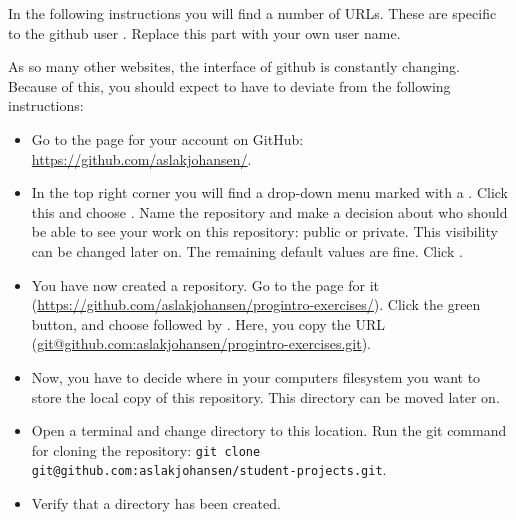 In the following instructions you will find a number of URLs. These are specific to the github user . Replace this part with your own user name.

As so many other websites, the interface of github is constantly changing. Because of this, you should expect to have to deviate from the following instructions:

\begin{itemize}
  \item Go to the page for your account on GitHub: \url{https://github.com/aslakjohansen/}.
  \item In the top right corner you will find a drop-down menu marked with a \say{+}. Click this and choose . Name the repository  and make a decision about who should be able to see your work on this repository: public or private. This visibility can be changed later on. The remaining default values are fine. Click .
  \item You have now created a repository. Go to the page for it (\url{https://github.com/aslakjohansen/progintro-exercises/}). Click the green  button, and choose  followed by . Here, you copy the URL (\url{git@github.com:aslakjohansen/progintro-exercises.git}).
  \item Now, you have to decide where in your computers filesystem you want to store the local copy of this repository. This directory can be moved later on.
  \item Open a terminal and change directory to this location. Run the git command for cloning the repository: \texttt{git clone git@github.com:aslakjohansen/student-projects.git}.
  \item Verify that a  directory has been created.
\end{itemize}

